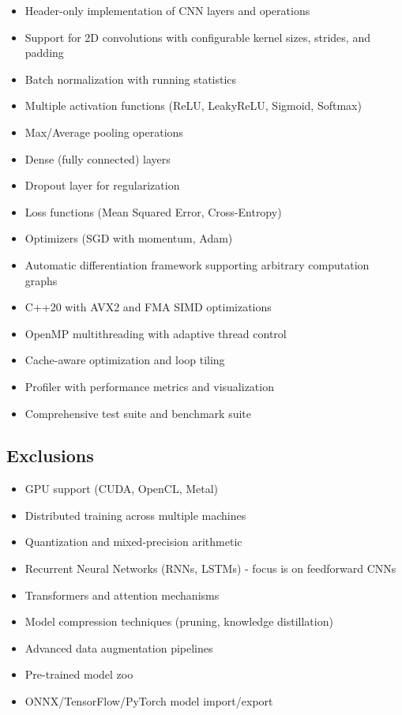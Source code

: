 \documentclass[12pt,oneside,a4paper]{report}
\begin{document}
\begin{itemize}
    \item Header-only implementation of CNN layers and operations
    \item Support for 2D convolutions with configurable kernel sizes, strides, and padding
    \item Batch normalization with running statistics
    \item Multiple activation functions (ReLU, LeakyReLU, Sigmoid, Softmax)
    \item Max/Average pooling operations
    \item Dense (fully connected) layers
    \item Dropout layer for regularization
    \item Loss functions (Mean Squared Error, Cross-Entropy)
    \item Optimizers (SGD with momentum, Adam)
    \item Automatic differentiation framework supporting arbitrary computation graphs
    \item C++20 with AVX2 and FMA SIMD optimizations
    \item OpenMP multithreading with adaptive thread control
    \item Cache-aware optimization and loop tiling
    \item Profiler with performance metrics and visualization
    \item Comprehensive test suite and benchmark suite
\end{itemize}

\subsection{Exclusions}

\begin{itemize}
    \item GPU support (CUDA, OpenCL, Metal)
    \item Distributed training across multiple machines
    \item Quantization and mixed-precision arithmetic
    \item Recurrent Neural Networks (RNNs, LSTMs) - focus is on feedforward CNNs
    \item Transformers and attention mechanisms
    \item Model compression techniques (pruning, knowledge distillation)
    \item Advanced data augmentation pipelines
    \item Pre-trained model zoo
    \item ONNX/TensorFlow/PyTorch model import/export
\end{itemize}
\end{document}
